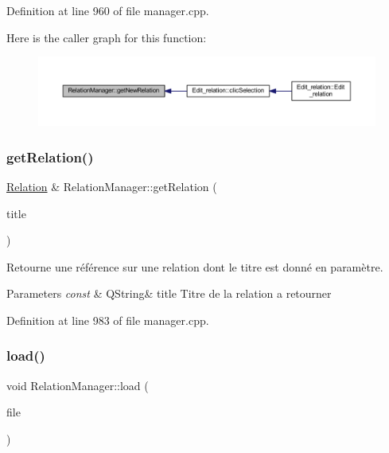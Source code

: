 Definition at line 960 of file manager.\+cpp.

Here is the caller graph for this function\+:\nopagebreak
\begin{figure}[H]
\begin{center}
\leavevmode
\includegraphics[width=350pt]{class_relation_manager_a1f9d556e0505105205e1fdb4905c4a80_icgraph}
\end{center}
\end{figure}
\mbox{\label{class_relation_manager_ad9ffbaba761149560d915f081d379ecc}} 
\subsubsection{\texorpdfstring{get\+Relation()}{getRelation()}}
{\footnotesize\ttfamily \hyperlink{class_relation}{Relation} \& Relation\+Manager\+::get\+Relation (\begin{DoxyParamCaption}\item[{const Q\+String \&}]{title }\end{DoxyParamCaption})}



Retourne une référence sur une relation dont le titre est donné en paramètre. 


\begin{DoxyParams}{Parameters}
{\em const} & Q\+String\& title Titre de la relation a retourner \\
\hline
\end{DoxyParams}


Definition at line 983 of file manager.\+cpp.

\mbox{\label{class_relation_manager_a37273bc4c1d223bf99ff10ba7feba50a}} 
\subsubsection{\texorpdfstring{load()}{load()}}
{\footnotesize\ttfamily void Relation\+Manager\+::load (\begin{DoxyParamCaption}\item[{const Q\+String \&}]{file }\end{DoxyParamCaption})}



